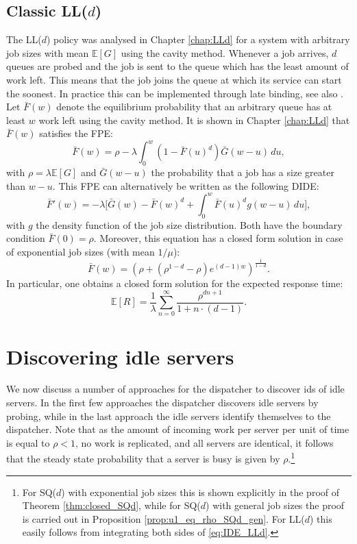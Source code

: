 \documentclass[12pt]{report}
\newcommand{\E}{\mathbb{E}}
\begin{document}
\subsection{Classic LL($d$)} \label{sec:LLd_explained}
The LL($d$) policy was analysed in Chapter \ref{chap:LLd} for a system with arbitrary job sizes
with mean $\E[G]$
using the cavity method. Whenever a job arrives, $d$ queues are probed and the job is sent to the queue which has the least amount of work left. This means that the job joins the queue at which its service can start the soonest. In practice this can be implemented through late binding, see also \cite{Sparrow}. 
Let $\bar F(w)$ denote the equilibrium probability that an arbitrary queue has at least $w$ work left
using the cavity method. 
It is shown in Chapter \ref{chap:LLd} that $\bar F(w)$ satisfies the FPE:
\begin{equation} \label{eq:FbarW_classicSQd_IDE}
\bar F(w)
=
\rho - \lambda \int_0^w (1-\bar F(u)^d) \bar G(w-u) \, du,
\end{equation}
with $\rho = \lambda \E[G]$ and $\bar G(w-u)$ the probability that a job has a size greater than $w-u$.
This FPE can alternatively be written as the following DIDE:
$$
\bar F'(w)
=
-\lambda \bigg[
\bar G(w) - \bar F(w)^d + \int_0^w \bar F(u)^d g(w-u) \, du
\bigg],
$$
with $g$ the density function of the job size distribution.
Both have the boundary condition $\bar F(0) = \rho$. Moreover, this equation has a closed form solution in case of exponential job sizes (with mean $1/\mu$):
\begin{equation} \label{eq:FbarW_classicSQd_closed}
\bar F(w)=(\rho + (\rho^{1-d}-\rho) e^{(d-1)w})^{\frac{1}{1-d}}.
\end{equation}
In particular, one obtains a closed form solution for the expected response time:
\begin{equation} \label{eq:ER_LLd_vanilla}
\E[R]= \frac{1}{\lambda} \sum_{n=0}^\infty \frac{\rho^{dn+1}}{1+n\cdot (d-1)}.
\end{equation}

\section{Discovering idle servers} \label{sec:examples_memory}
We now discuss a number of approaches for the dispatcher to discover ids of idle servers.
In the first few approaches the dispatcher discovers idle servers by probing, while in the
last approach the idle servers identify themselves to the dispatcher.  Note that as the amount of incoming work per server per unit of time is equal to $\rho<1$, no work is replicated, and all servers are identical, it follows that the steady state probability that a server is busy is given by 
$\rho$.\footnote{For SQ($d$) with exponential job sizes this is shown explicitly in the proof of Theorem \ref{thm:closed_SQd}, while for SQ($d$) with general job sizes the proof is carried out in Proposition \ref{prop:u1_eq_rho_SQd_gen}. For LL($d$) this easily follows from integrating both sides of \eqref{eq:IDE_LLd}.}
\end{document}
